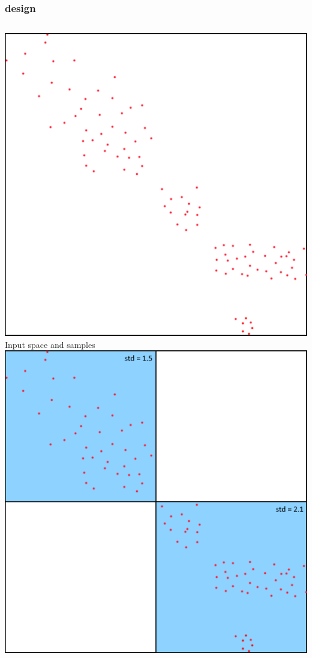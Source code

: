 \documentclass[presentation]{beamer}
\begin{document}
\begin{frame}
\frametitle{\gridex design}
	\begin{columns}[t]
			\centering
			\includegraphics[width = \columnwidth]{img/demo/1.pdf}\\
			\scriptsize Input space and samples
			\centering
			\includegraphics[width = \columnwidth]{img/demo/2.pdf}\\

\end{columns}
\end{frame}
\end{document}
